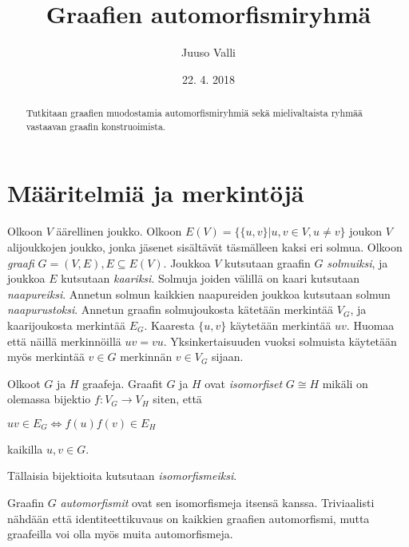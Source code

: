 \documentclass[a4paper, 12pt]{article}
\theoremstyle{definition}
\theoremstyle{plain}
\begin{document}
\title{Graafien automorfismiryhmä}
\author{Juuso Valli}
\date{22. 4. 2018}

\maketitle

\begin{abstract}
Tutkitaan graafien muodostamia automorfismiryhmiä sekä mielivaltaista ryhmää vastaavan graafin konstruoimista.
\end{abstract}

\tableofcontents

\newpage

\section{Määritelmiä ja merkintöjä}

Olkoon $V$ äärellinen joukko. Olkoon $E(V) = \{\{u, v\} | u, v \in V, u \neq v\}$ joukon $V$ alijoukkojen joukko, jonka jäsenet sisältävät täsmälleen kaksi eri solmua.
Olkoon \emph{graafi} $G = (V, E), E \subseteq E(V)$. Joukkoa $V$ kutsutaan graafin $G$ \emph{solmuiksi}, ja joukkoa $E$ kutsutaan \emph{kaariksi}. Solmuja joiden välillä on kaari kutsutaan \emph{naapureiksi}. Annetun solmun kaikkien naapureiden joukkoa kutsutaan solmun \emph{naapurustoksi}. Annetun graafin solmujoukosta kätetään merkintää $V_G$, ja kaarijoukosta merkintää $E_G$.
Kaaresta $\{u, v\}$ käytetään merkintää $uv$. Huomaa että näillä merkinnöillä $uv = vu$.
Yksinkertaisuuden vuoksi solmuista käytetään myös merkintää $v \in G$ merkinnän $v \in V_G$ sijaan.

Olkoot $G$ ja $H$ graafeja. Graafit $G$ ja $H$ ovat \emph{isomorfiset} $G \cong H$ mikäli on olemassa bijektio $f: V_G \rightarrow V_H$ siten, että
\begin{center}
\begin{math}
uv \in E_G \Longleftrightarrow f(u)f(v) \in E_H
\end{math}
\end{center}
kaikilla $u, v \in G$.

Tällaisia bijektioita kutsutaan \emph{isomorfismeiksi}.

Graafin $G$ \emph{automorfismit} ovat sen isomorfismeja itsensä kanssa. Triviaalisti nähdään että identiteettikuvaus on kaikkien graafien automorfismi, mutta graafeilla voi olla myös muita automorfismeja.
\end{document}
